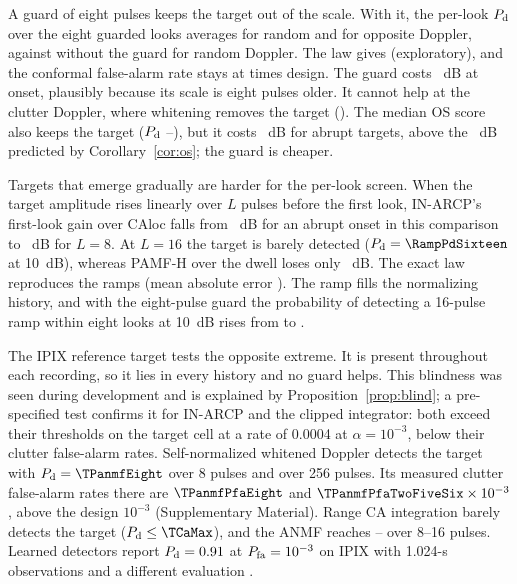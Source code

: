 \documentclass[journal]{IEEEtran}
\begin{document}
A guard of eight pulses keeps the target out of the scale. With it, the per-look $P_{\rm d}$ over the eight guarded looks averages \GuardMeanLookEight{} for random and \GuardOppEight{} for opposite Doppler, against \GuardMeanLookZero{} without the guard for random Doppler. The law gives \GuardLawEight{} (exploratory), and the conformal false-alarm rate stays at \GuardPfaEight{} times design. The guard costs \GuardOnsetCost~dB at onset, plausibly because its scale is eight pulses older. It cannot help at the clutter Doppler, where whitening removes the target (\GuardMatchedEight). The median OS score also keeps the target ($P_{\rm d}$ \OsPersFirst--\OsPersLast), but it costs \OsCostEight~dB for abrupt targets, above the \OSLossEight~dB predicted by Corollary~\ref{cor:os}; the guard is cheaper.

Targets that emerge gradually are harder for the per-look screen. When the target amplitude rises linearly over $L$ pulses before the first look, IN-ARCP's first-look gain over CAloc falls from \RampGainOne~dB for an abrupt onset in this comparison to \RampGainEight~dB for $L=8$. At $L=16$ the target is barely detected ($P_{\rm d}=\RampPdSixteen$ at 10~dB), whereas PAMF-H over the dwell loses only \RampPAMFLoss~dB. The exact law reproduces the ramps (mean absolute error \RampMae). The ramp fills the normalizing history, and with the eight-pulse guard the probability of detecting a 16-pulse ramp within eight looks at 10~dB rises from \GuardRampZero{} to \GuardRampEight.

\label{sec:realtarget}The IPIX reference target tests the opposite extreme. It is present throughout each recording, so it lies in every history and no guard helps. This blindness was seen during development and is explained by Proposition~\ref{prop:blind}; a pre-specified test confirms it for IN-ARCP and the clipped integrator: both exceed their thresholds on the target cell at a rate of 0.0004 at $\alpha=10^{-3}$, below their clutter false-alarm rates. Self-normalized whitened Doppler detects the target with $P_{\rm d}=\TPanmfEight$ over 8 pulses and \TPanmfTwoFiveSix{} over 256 pulses. Its measured clutter false-alarm rates there are $\TPanmfPfaEight$ and $\TPanmfPfaTwoFiveSix\times10^{-3}$, above the design $10^{-3}$ (Supplementary Material). Range CA integration barely detects the target ($P_{\rm d}\le\TCaMax$), and the ANMF reaches \TFpEight--\TFpSixteen{} over 8--16 pulses. Learned detectors report $P_{\rm d}=0.91$ at $P_{\rm fa}=10^{-3}$ on IPIX with 1.024-s observations and a different evaluation \cite{qu2023sensors}.
\end{document}
